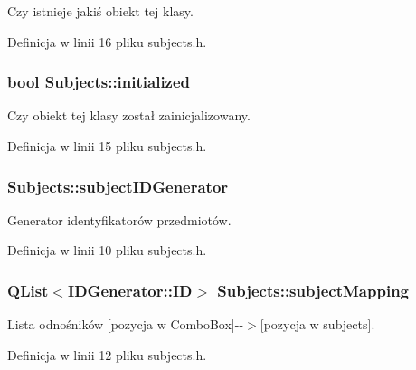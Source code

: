 Czy istnieje jakiś obiekt tej klasy. 



Definicja w linii 16 pliku subjects.h.

\hypertarget{classSubjects_aa7ef99d4c5a3e333205fab3733176f17}{
\subsubsection[{initialized}]{\setlength{\rightskip}{0pt plus 5cm}bool {\bf Subjects::initialized}}}
\label{classSubjects_aa7ef99d4c5a3e333205fab3733176f17}


Czy obiekt tej klasy został zainicjalizowany. 



Definicja w linii 15 pliku subjects.h.

\hypertarget{classSubjects_a31677c61fa2c31db7b8d17ac96ddd83e}{
\subsubsection[{subjectIDGenerator}]{ {\bf Subjects::subjectIDGenerator}}}
\label{classSubjects_a31677c61fa2c31db7b8d17ac96ddd83e}


Generator identyfikatorów przedmiotów. 



Definicja w linii 10 pliku subjects.h.

\hypertarget{classSubjects_ac97553ca1a09d08d019ae1bd2f017615}{
\subsubsection[{subjectMapping}]{\setlength{\rightskip}{0pt plus 5cm}QList$<${\bf IDGenerator::ID}$>$ {\bf Subjects::subjectMapping}}}
\label{classSubjects_ac97553ca1a09d08d019ae1bd2f017615}


Lista odnośników \mbox{[}pozycja w ComboBox\mbox{]}-\/-\/$>$\mbox{[}pozycja w subjects\mbox{]}. 



Definicja w linii 12 pliku subjects.h.

